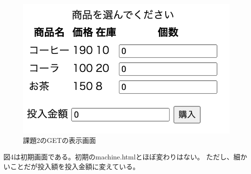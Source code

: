 \documentclass[12pt]{jarticle}
\begin{document}
\begin{figure}[h]
    \begin{center}
        \includegraphics[scale=0.2]{kadai2_2_1.png}
    \end{center}
    \caption{課題2のGETの表示画面}
\end{figure}
図4は初期画面である。初期のmachine.htmlとほぼ変わりはない。
ただし、細かいことだが投入額を投入金額に変えている。

\clearpage
\end{document}
